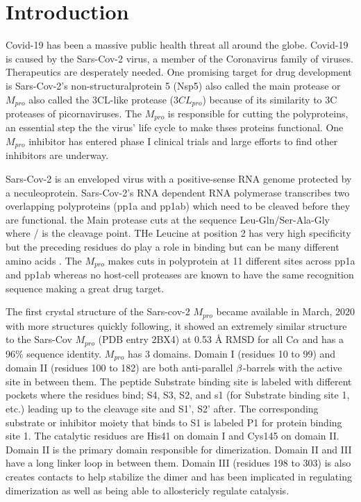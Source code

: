 \documentclass{biophys-new}
\begin{document}
\section*{Introduction}

Covid-19 has been a massive public health threat all around the globe. Covid-19 is caused by the Sars-Cov-2 virus, a member of the Coronavirus family of viruses. Therapeutics are desperately needed. One promising target for drug development is Sars-Cov-2's non-structuralprotein 5 (Nsp5) also called the main protease or $M_{pro}$ also called the 3CL-like protease ($3CL_{pro}$) because of its similarity to 3C proteases of picornaviruses\cite{tan2005ph}. The $M_{pro}$ is responsible for cutting the polyproteins, an essential step the the virus' life cycle to make thses proteins functional. One $M_{pro}$ inhibitor has entered phase I clinical trials and large efforts to find other inhibitors are underway\cite{achdout2020covid}.

Sars-Cov-2 is an enveloped virus with a positive-sense RNA genome protected by a neculeoprotein. Sars-Cov-2's RNA dependent RNA polymerase transcribes two overlapping polyproteins (pp1a and pp1ab) which need to be cleaved before they are functional. the Main protease cuts at the sequence Leu-Gln/Ser-Ala-Gly  where / is the cleavage point\cite{Zhang409}. THe Leucine at position 2 has very high specificity but the preceding residues do play a role in binding but can be many different amino acids \cite{rut2020substrate}. The $M_{pro}$ makes cuts in polyprotein at 11 different sites across pp1a and pp1ab whereas no host-cell proteases are known to have the same recognition sequence making a great drug target\cite{hilgenfeld2014sars}. 

The first crystal structure of the Sars-cov-2 $M_{pro}$ became available in March, 2020 \cite{Zhang409} with more structures quickly following\cite{owen2020sars}\cite{jin2020structure}, it showed an extremely similar structure to the Sars-Cov $M_{pro}$ (PDB entry 2BX4)\cite{tan2005ph} at 0.53 Å RMSD for all C$\alpha$ and has a 96\% sequence identity\cite{Zhang409}. $M_{pro}$ has 3 domains. Domain I (residues 10 to 99) and domain II (residues 100 to 182) are both anti-parallel $\MakeUppercase{\beta}$-barrels with the active site in between them. The peptide Substrate binding site is labeled with different pockets where the residues bind; S4, S3, S2, and s1 (for Substrate binding site 1, etc.) leading up to the cleavage site and S1', S2' after. The corresponding substrate or inhibitor moiety that binds to S1 is labeled P1 for protein binding site 1. The catalytic residues are His41 on domain I and Cys145 on domain II. Domain II is the primary domain responsible for dimerization. Domain II and III have a long linker loop in between them. Domain III (residues 198 to 303) is also creates contacts to help stabilize the dimer and has been implicated in regulating dimerization as well as being able to allostericly regulate catalysis.
\end{document}
